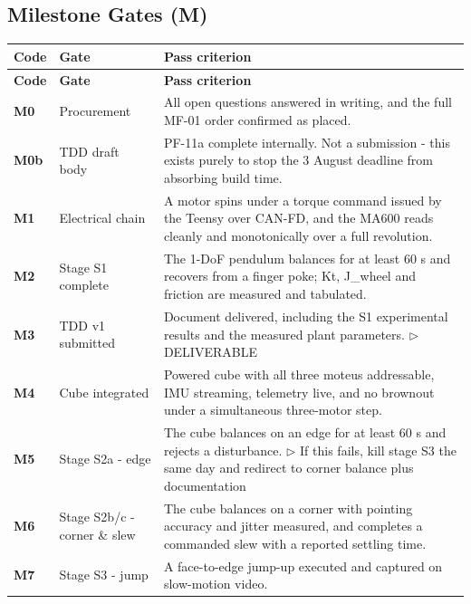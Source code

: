 \subsection{Milestone Gates (M)}
{\small
\setlength{\tabcolsep}{4pt}%
\begin{longtable}{@{}L{1.1cm} L{3.0cm} L{11.0cm}@{}}
\toprule
\textbf{Code} & \textbf{Gate} & \textbf{Pass criterion} \\
\midrule\endfirsthead
\toprule
\textbf{Code} & \textbf{Gate} & \textbf{Pass criterion} \\
\midrule\endhead
\bottomrule\endfoot
\textbf{M0} & Procurement & All open questions answered in writing, and the full MF-01 order confirmed as placed. \\[2pt]
\textbf{M0b} & TDD draft body & PF-11a complete internally. Not a submission - this exists purely to stop the 3 August deadline from absorbing build time. \\[2pt]
\textbf{M1} & Electrical chain & A motor spins under a torque command issued by the Teensy over CAN-FD, and the MA600 reads cleanly and monotonically over a full revolution. \\[2pt]
\textbf{M2} & Stage S1 complete & The 1-DoF pendulum balances for at least 60 s and recovers from a finger poke; Kt, J\_wheel and friction are measured and tabulated. \\[2pt]
\textbf{M3} & TDD v1 submitted & Document delivered, including the S1 experimental results and the measured plant parameters. \newline\textcolor{p0col}{\footnotesize$\triangleright$ DELIVERABLE} \\[2pt]
\textbf{M4} & Cube integrated & Powered cube with all three moteus addressable, IMU streaming, telemetry live, and no brownout under a simultaneous three-motor step. \\[2pt]
\textbf{M5} & Stage S2a - edge & The cube balances on an edge for at least 60 s and rejects a disturbance. \newline\textcolor{p0col}{\footnotesize$\triangleright$ If this fails, kill stage S3 the same day and redirect to corner balance plus documentation} \\[2pt]
\textbf{M6} & Stage S2b/c - corner \& slew & The cube balances on a corner with pointing accuracy and jitter measured, and completes a commanded slew with a reported settling time. \\[2pt]
\textbf{M7} & Stage S3 - jump & A face-to-edge jump-up executed and captured on slow-motion video. \\[2pt]
\end{longtable}
}
